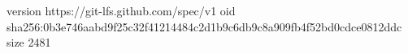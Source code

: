 version https://git-lfs.github.com/spec/v1
oid sha256:0b3e746aabd9f25c32f41214484c2d1b9c6db9c8a909fb4f52bd0cdce0812ddc
size 2481
